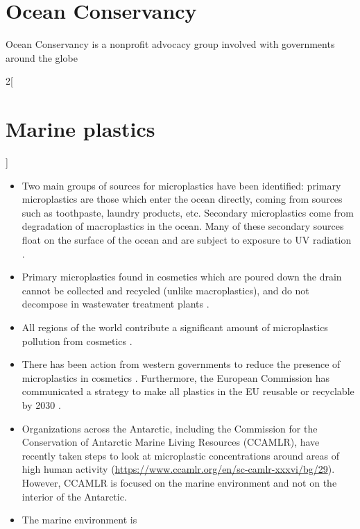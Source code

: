 \documentclass{article}
\begin{document}
\section{Ocean Conservancy}
Ocean Conservancy is a nonprofit advocacy group involved with governments around the globe 

\begin{multicols}{2}[
    \section{Marine plastics}
]
\begin{itemize}
    \item Two main groups of sources for microplastics have been identified: primary microplastics are those which enter the ocean directly, coming from sources such as toothpaste, laundry products, etc. Secondary microplastics come from degradation of macroplastics in the ocean. Many of these secondary sources float on the surface of the ocean and are subject to exposure to UV radiation \cite{microplastics2017}.
    
    \item Primary microplastics found in cosmetics which are poured down the drain cannot be collected and recycled (unlike macroplastics), and do not decompose in wastewater treatment plants \cite{unepcosmetics2015}.
    
    \item All regions of the world contribute a significant amount of microplastics pollution from cosmetics \cite{pmpsinoceans2017}.
    
    \item There has been action from western governments to reduce the presence of microplastics in cosmetics \cite{mpsincosmetics2019}. Furthermore, the European Commission has communicated a strategy to make all plastics in the EU reusable or recyclable by 2030 \cite{ecplastics2018}.
    
    \item Organizations across the Antarctic, including the Commission for the Conservation of Antarctic Marine Living Resources (CCAMLR), have recently taken steps to look at microplastic concentrations around areas of high human activity (\url{https://www.ccamlr.org/en/sc-camlr-xxxvi/bg/29}). However, CCAMLR is focused on the marine environment and not on the interior of the Antarctic.
    
    \item The marine environment is 
\end{itemize}
\end{multicols}
\end{document}
